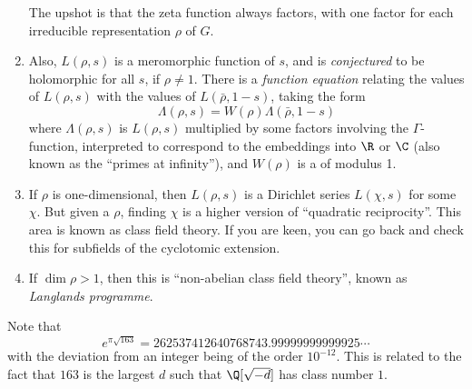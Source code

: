 \documentclass[a4paper]{article}
\begin{document}
\begin{enumerate}
  The upshot is that the zeta function always factors, with one factor for each irreducible representation $\rho$ of $G$. 
  \item Also, $L(\rho, s)$ is a meromorphic function of $s$, and is \emph{conjectured} to be holomorphic for all $s$, if $\rho \not= 1$. There is a \emph{function equation} relating the values of $L(\rho,s)$ with the values of $L(\bar{\rho},1-s)$, taking the form
  \[
    \Lambda(\rho,s)=W(\rho)\Lambda(\bar{\rho},1-s)
  \]
  where $\Lambda(\rho,s)$ is $L(\rho,s)$ multiplied by some factors involving the $\Gamma$-function, interpreted to correspond to the embeddings into $\R$ or $\C$ (also known as the ``primes at infinity''), and $W(\rho)$ is a  of modulus 1.
  \item If $\rho$ is one-dimensional, then $L(\rho, s)$ is a Dirichlet series $L(\chi, s)$ for some $\chi$. But given a $\rho$, finding $\chi$ is a higher version of ``quadratic reciprocity''. This area is known as class field theory. If you are keen, you can go back and check this for subfields of the cyclotomic extension.
  \item If $\dim \rho > 1$, then this is ``non-abelian class field theory'', known as \emph{Langlands programme}.
\end{enumerate}

Note that
\[
  e^{\pi\sqrt{163}} = 262537412640768743.99999999999925\cdots
\]
with the deviation from an integer being of the order $10^{-12}$. This is related to the fact that $163$ is the largest $d$ such that $\Q[\sqrt{-d}]$ has class number $1$.
\printindex
\end{document}
